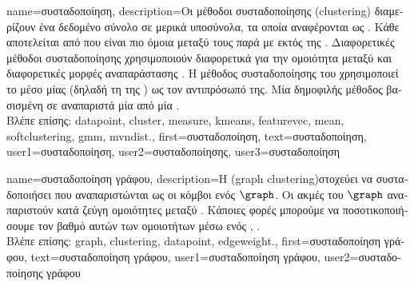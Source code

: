 {name={\foreignlanguage{greek}{συσταδοποίηση}}, 
	description={\foreignlanguage{greek}{Οι μέθοδοι συσταδοποίησης} (clustering) 
		\foreignlanguage{greek}{διαμερίζουν ένα δεδομένο σύ\-νο\-λο}  \foreignlanguage{greek}{σε μερικά υποσύνολα, 
		τα οποία αναφέρονται ως} . \foreignlanguage{greek}{Κάθε}  
		\foreignlanguage{greek}{αποτελείται από}  \foreignlanguage{greek}{που είναι πιο όμοια μεταξύ τους παρά με} 
		 \foreignlanguage{greek}{εκτός της} . \foreignlanguage{greek}{Διαφορετικές μέθοδοι 
		συσταδοποίησης χρησιμοποιούν διαφορετικά}  \foreignlanguage{greek}{για την ομοιότητα μεταξύ} 
		 \foreignlanguage{greek}{και διαφορετικές μορφές αναπαράστασης} . 
		\foreignlanguage{greek}{Η μέθοδος συσταδοποίησης του}  \foreignlanguage{greek}{χρησιμοποιεί το μέσο} 
		 \foreignlanguage{greek}{μίας}  \foreignlanguage{greek}{(δηλαδή τη}  
		\foreignlanguage{greek}{της} ) \foreignlanguage{greek}{ως τον αντιπρόσωπό της. Μία δημοφιλής μέθοδος} 
		 \foreignlanguage{greek}{βασισμένη σε}  \foreignlanguage{greek}{αναπαριστά μία} 
		 \foreignlanguage{greek}{από μία} .
		\\
		\foreignlanguage{greek}{Βλέπε επίσης:} \gls{datapoint}, \gls{cluster}, \gls{measure}, \gls{kmeans}, \gls{featurevec}, \gls{mean}, 
		\gls{softclustering}, \gls{gmm}, \gls{mvndist}.},
	first={\foreignlanguage{greek}{συσταδοποίηση}},
	text={\foreignlanguage{greek}{συσταδοποίηση}},
	user1={\foreignlanguage{greek}{συσταδοποίηση}}, %
	user2={\foreignlanguage{greek}{συσταδοποίησης}}, %
	user3={\foreignlanguage{greek}{συσταδοποίηση}} %
}

{name={\foreignlanguage{greek}{συσταδοποίηση γράφου}},
	description={\foreignlanguage{greek}{Η}   
		(graph clustering)\linebreak \foreignlanguage{greek}{στοχεύει να συσταδοποιήσει}  \foreignlanguage{greek}{που 
		αναπαριστώνται ως οι κόμβοι ενός}  $\graph$. \foreignlanguage{greek}{Οι ακμές του $\graph$ αναπαριστούν 
		κατά ζεύ\-γη ομοιότητες μεταξύ} . \foreignlanguage{greek}{Κάποιες φορές μπορούμε να 
		ποσοτικοποιήσουμε τον βαθμό αυτών των ομοιοτήτων μέσω ενός}  \cite{Luxburg2007}, \cite{FlowSpecClustering2021}.
		\\
		\foreignlanguage{greek}{Βλέπε επίσης:} \gls{graph}, \gls{clustering}, \gls{datapoint}, \gls{edgeweight}.}, 
	first={\foreignlanguage{greek}{συσταδοποίηση γράφου}},
	text={\foreignlanguage{greek}{συσταδοποίηση γράφου}},
	user1={\foreignlanguage{greek}{συσταδοποίηση γράφου}}, %
    	user2={\foreignlanguage{greek}{συσταδοποίησης γράφου}} %
}


